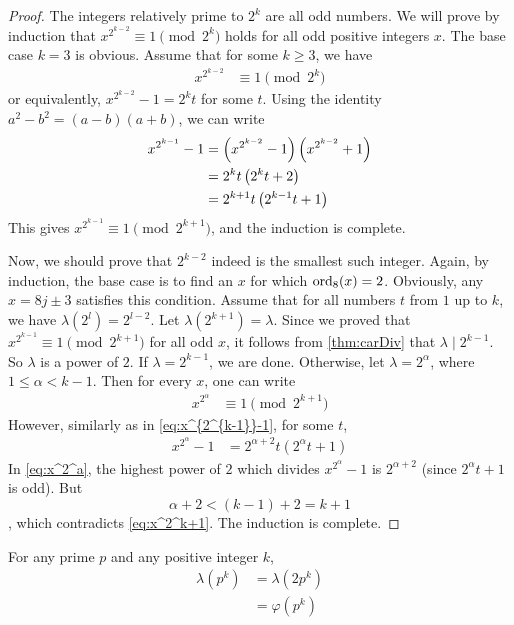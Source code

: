 \documentclass{subfile}
\begin{document}
	\begin{proof}
		The integers relatively prime to $2^k$ are all odd numbers. We will prove by induction that $x^{2^{k-2}} \equiv1\pmod{2^k}$ holds for all odd positive integers $x$. The base case $k=3$ is obvious. Assume that for some $k\geq 3$, we have
			\begin{align*}
				x^{2^{k-2}} & \equiv1\pmod{2^k}
			\end{align*}
		or equivalently, $x^{2^{k-2}} -1=2^kt$ for some $t$. Using the identity $a^2-b^2=(a-b)(a+b)$, we can write
			\begin{align}
				x^{2^{k-1}} -1
					& = \left(x^{2^{k-2}} -1\right)\left(x^{2^{k-2}} +1\right)\\
					& = 2^kt\left(2^kt +2\right)\\
					& = 2^{k+1}t \left(2^{k-1}t+1\right) \label{eq:x^{2^{k-1}}-1}
			\end{align}
		This gives $x^{2^{k-1}} \equiv 1\pmod{2^{k+1}}$, and the induction is complete.

		Now, we should prove that $2^{k-2}$ indeed is the smallest such integer. Again, by induction, the base case is to find an $x$ for which $\operatorname{ord}_8(x)=2$. Obviously, any $x=8j\pm3$ satisfies this condition. Assume that for all numbers $t$ from $1$ up to $k$, we have $\lambda(2^l)=2^{l-2}$. Let $\lambda(2^{k+1})=\lambda$. Since we proved that $x^{2^{k-1}} \equiv 1\pmod{2^{k+1}}$ for all odd $x$, it follows from \autoref{thm:carDiv} that $\lambda \mid 2^{k-1}$. So $\lambda$ is a power of $2$. If $\lambda = 2^{k-1}$, we are done. Otherwise, let $\lambda=2^\alpha$, where $1 \leq \alpha <k-1$. Then for every $x$, one can write
			\begin{align}\label{eq:x^2^k+1}
				x^{2^\alpha}
					& \equiv 1 \pmod{2^{k+1}}
			\end{align}
		However, similarly as in \eqref{eq:x^{2^{k-1}}-1}, for some $t$,
			\begin{align}\label{eq:x^2^a}
				x^{2^{\alpha}} -1
					&= 2^{\alpha+2}t \left(2^{\alpha}t+1\right)
			\end{align}
		In \eqref{eq:x^2^a}, the highest power of $2$ which divides $x^{2^{\alpha}} -1$ is $2^{\alpha+2}$ (since $2^{\alpha}t+1$ is odd). But $$\alpha+2 <(k-1)+2=k+1$$, which contradicts \eqref{eq:x^2^k+1}. The induction is complete.
	\end{proof}

	\begin{theorem}
		For any prime $p$ and any positive integer $k$,
			\begin{align*}
				\lambda(p^k)
					& =\lambda(2p^k)\\
					& =\varphi(p^k)
			\end{align*}
	\end{theorem}
\end{document}
